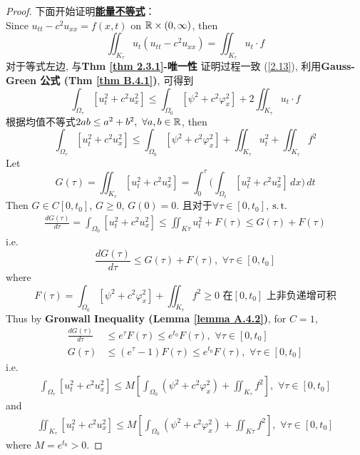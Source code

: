 	\begin{proof}
		下面开始证明\underline{\textbf{能量不等式}}：\\
		Since $u_{tt} - c^2 u_{xx} = f(x , t)$ on $\mathbb{R} \times (0 , \infty)$, then
		\[ \iint_{K_\tau} u_t(u_{tt} - c^2 u_{xx}) = \iint_{K_\tau} u_t \cdot f \]
		对于等式左边, 与\textbf{Thm \ref{thm 2.3.1}-唯一性} 证明过程一致 (\ref{2.13}), 利用\textbf{Gauss-Green 公式 (Thm \ref{thm B.4.1})}, 可得到
		\[ \int_{\Omega_\tau} [ u_{t}^2 + c^2 u_{x}^2 ] \leq \int_{\Omega_0} [ \psi^2 + c^2 \varphi_{x}^2 ] + 2\iint_{K_\tau} u_t \cdot f \]
		根据均值不等式$2ab \leq a^2 + b^2 , \,\, \forall a , b \in \mathbb{R}$, then
		\[ \int_{\Omega_\tau} [ u_{t}^2 + c^2 u_{x}^2 ] \leq \int_{\Omega_0} [ \psi^2 + c^2 \varphi_{x}^2 ] + \iint_{K_\tau} u_{t}^2 + \iint_{K_\tau} f^2 \]
		Let
		\[ G(\tau) = \iint_{K_\tau} [u_{t}^2 + c^2 u_{x}^2] = \int_{0}^\tau \Big( \int_{\Omega_t} [ u_{t}^2 + c^2 u_{x}^2 ] \, dx \Big) \, dt \]
		Then $G \in C[0 , t_0]$, $G \geq 0$, $G(0) = 0$. 且对于$\forall \tau \in [0 , t_0]$, $\operatorname{s.t.}$
		\begin{align*}
			\frac{dG(\tau)}{d\tau} = \int_{\Omega_0} [u_{t}^2 + c^2 u_{x}^2] 
			\leq \iint_{K\tau} u_{t}^2 + F(\tau) 
			\leq G(\tau) + F(\tau)
		\end{align*}
		i.e.
		\[ \frac{dG(\tau)}{d\tau} \leq G(\tau) + F(\tau) , \,\, \forall \tau \in [0 , t_0] \]
		where 
		\[ F(\tau) = \int_{\Omega_0} [\psi^2 + c^2 \varphi_{x}^2] + \iint_{K_\tau} f^2 \geq 0 \,\, \text{在$[0 , t_0]$ 上非负递增可积} \]
		Thus by \textbf{Gronwall Inequality (Lemma \ref{lemma A.4.2})}, for $C = 1$, 
		\begin{align*}
			\frac{dG(\tau)}{d\tau} &\leq e^{\tau} F(\tau) \leq e^{t_0} F(\tau) , \,\, \forall \tau \in [0 , t_0] \\
			G(\tau) &\leq ( e^{\tau} - 1 ) F(\tau) \leq e^{t_0} F(\tau) , \,\, \forall \tau \in [0 , t_0]
		\end{align*}
		i.e.
		\begin{align*}
			\int_{\Omega_\tau} [u_{t}^2 + c^2 u_{x}^2] 
			\leq M \left[ \int_{\Omega_0} ( \psi^2 + c^2 \varphi_{x}^2 ) + \iint_{K_\tau} f^2 \right] , \,\, \forall \tau \in [0 , t_0] 
		\end{align*}
		and
		\begin{align*}
			\iint_{K_\tau} [u_{t}^2 + c^2 u_{x}^2] 
			\leq M \left[ \int_{\Omega_0} (\psi^2 + c^2 \varphi_{x}^2) + \iint_{K\tau} f^2 \right] , \,\, \forall \tau \in [0 , t_0]
		\end{align*}
		where $M = e^{t_0} > 0$. 
	\end{proof}








